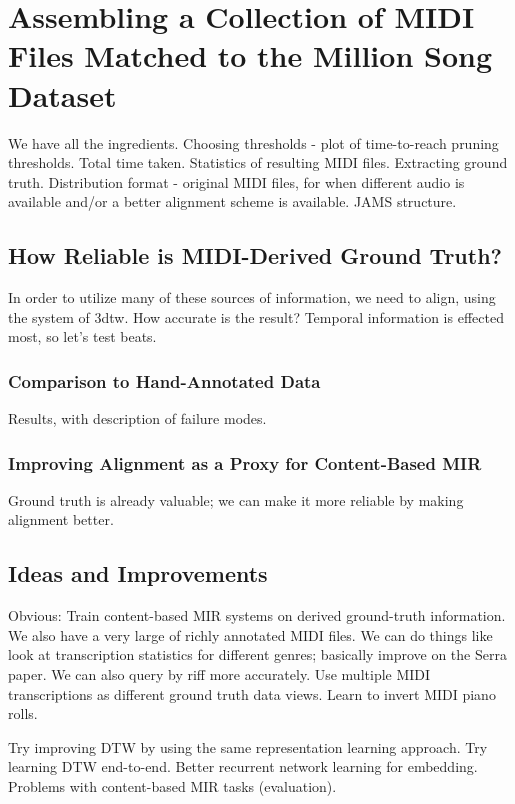 \chapter{Assembling a Collection of MIDI Files Matched to the Million Song Dataset}
\label{ch:assembling}

We have all the ingredients.
Choosing thresholds - plot of time-to-reach pruning thresholds.
Total time taken.
Statistics of resulting MIDI files.
Extracting ground truth.
Distribution format - original MIDI files, for when different audio is available and/or a better alignment scheme is available.
JAMS structure.

\section{How Reliable is MIDI-Derived Ground Truth?}
\label{sec:reliability}

In order to utilize many of these sources of information, we need to align, using the system of 3dtw.
How accurate is the result?
Temporal information is effected most, so let's test beats.

\subsection{Comparison to Hand-Annotated Data}

Results, with description of failure modes.

\subsection{Improving Alignment as a Proxy for Content-Based MIR}

Ground truth is already valuable; we can make it more reliable by making alignment better.

\section{Ideas and Improvements}

Obvious: Train content-based MIR systems on derived ground-truth information.
We also have a very large of richly annotated MIDI files.
We can do things like look at transcription statistics for different genres; basically improve on the Serra paper.
We can also query by riff more accurately.
Use multiple MIDI transcriptions as different ground truth data views.
Learn to invert MIDI piano rolls.

Try improving DTW by using the same representation learning approach.
Try learning DTW end-to-end.
Better recurrent network learning for embedding.
Problems with content-based MIR tasks (evaluation).
